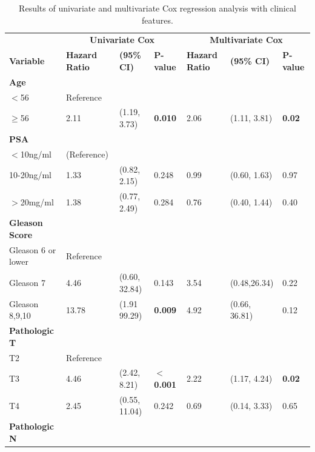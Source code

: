 \documentclass[twocolumn]{bmcart}%
\begin{document}
\begin{table}[ht!]
\caption{Results of univariate and multivariate Cox regression analysis with clinical features.}
\begin{tabular}{lllllll}
\toprule
& \multicolumn{3}{c}{\textbf{Univariate Cox}}  & \multicolumn{3}{c}{\textbf{Multivariate Cox}} \\
    \cmidrule(lr){2-4}\cmidrule(lr){5-7}
\textbf{Variable} & \textbf{Hazard Ratio} & \textbf{(95\% CI)} & \textbf{P-value} & \textbf{Hazard Ratio} & \textbf{(95\% CI)} & \textbf{P-value}
\\
\toprule
\textbf{Age} & & & &
\\
\hspace{1mm} $<$56 & Reference & & &
\\
\hspace{1mm} $\geq$56 & 2.11 & (1.19, 3.73) & \textbf{0.010} & 2.06 & (1.11, 3.81) & \textbf{0.02} 
\\
\textbf{PSA} &  &  &  & 
\\
\hspace{1mm} $<$10ng/ml & (Reference) & & 
\\
\hspace{1mm} 10-20ng/ml & 1.33 & (0.82, 2.15) & 0.248 & 0.99 & (0.60, 1.63) & 0.97
\\
\hspace{1mm} $>$20mg/ml & 1.38 & (0.77, 2.49) & 0.284 & 0.76 & (0.40, 1.44) & 0.40
\\
\textbf{Gleason Score} & & & &
\\
\hspace{1mm} Gleason 6 or lower & Reference & & &
\\
\hspace{1mm} Gleason 7 & 4.46 & (0.60, 32.84) & 0.143 & 3.54 & (0.48,26.34) & 0.22 
\\
\hspace{1mm} Gleason 8,9,10 & 13.78 & (1.91 99.29) & \textbf{0.009} & 4.92 & (0.66, 36.81) & 0.12
\\
\textbf{Pathologic T} & & & &
\\
\hspace{1mm} T2 & Reference & & &
\\
\hspace{1mm} T3 & 4.46 & (2.42, 8.21) & \textbf{$<$0.001} & 2.22 & (1.17, 4.24) & \textbf{0.02}
\\
\hspace{1mm} T4 & 2.45 & (0.55, 11.04) & 0.242 & 0.69 & (0.14, 3.33) & 0.65
\\
\textbf{Pathologic N} & & & & 

\end{tabular}
\end{table}
\end{document}
